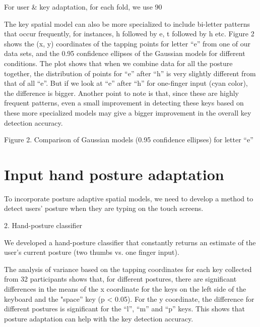 \documentclass{sigchi}
\begin{document}
For user & key adaptation, for each fold, we use 90%

The key spatial model can also be more specialized to include bi-letter patterns that occur frequently, for instances, h followed by e, t followed by h etc. Figure 2 shows the (x, y) coordinates of the tapping points for letter “e” from one of our data sets, and the 0.95 confidence ellipses of the Gaussian models for different conditions. The plot shows that when we combine data for all the posture together, the distribution of points for “e” after “h” is very slightly different from that of all “e”. But if we look at “e” after “h” for one-finger input (cyan color), the difference is bigger. Another point to note is that, since these are highly frequent patterns, even a small improvement in detecting these keys based on these more specialized models may give a bigger improvement in the overall key detection accuracy. 


Figure 2. Comparison of Gaussian models (0.95 confidence ellipses) for letter “e”

\section{Input hand posture adaptation}
To incorporate posture adaptive spatial models, we need to develop a method to
detect users' posture when they are typing on the touch screens. 

2. Hand-posture classifier

We developed a hand-posture classifier that constantly returns an estimate of the user’s current posture (two thumbs vs. one finger input).

The analysis of variance based on the tapping coordinates for each key collected from 32 participants shows that, for different postures, there are significant differences in the means of the x coordinate for the keys on the left side of the keyboard and the "space” key (p < 0.05). For the y coordinate, the difference for different postures is significant for the “l”, “m” and “p” keys. This shows that posture adaptation can help with the key detection accuracy.
\end{document}
